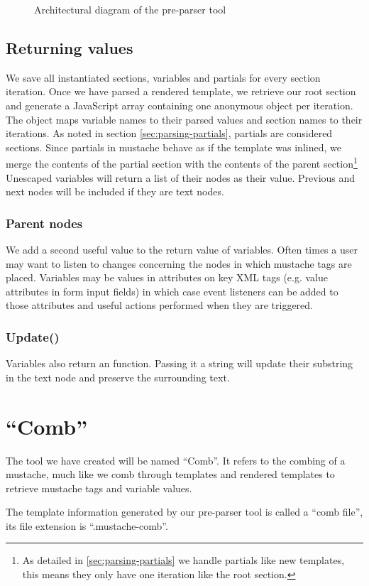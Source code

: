 \documentclass[thesis.tex]{subfiles}
\begin{document}
\begin{figure}
	\centering
	\resizebox{\linewidth}{!}{}
	\caption{Architectural diagram of the pre-parser tool}
	\label{fig:tool-arch}
\end{figure}

\subsection{Returning values}
We save all instantiated sections, variables and partials for every section
iteration. Once we have parsed a rendered template, we retrieve our root section
and generate a JavaScript array containing one anonymous object per iteration.
The object maps variable names to their parsed values and section names to their
iterations.
As noted in section \ref{sec:parsing-partials}, partials are considered
sections. Since partials in mustache behave as if the template was inlined,
we merge the contents of the partial section with the contents of the
parent section\footnote{
	As detailed in \ref{sec:parsing-partials} we handle partials like new
	templates, this means they only have one iteration like the root section.
}
Unescaped variables will return a list of their nodes as their value.
Previous and next nodes will be included if they are text nodes.

\subsubsection{Parent nodes}
\label{sec:parent-nodes}
We add a second useful value to the return value of variables. Often times a
user may want to listen to changes concerning the nodes in which mustache tags
are placed. Variables may be values in attributes on key XML tags
(e.g. value attributes in form input fields) in which case event listeners can
be added to those attributes and useful actions performed when they are
triggered.

\subsubsection{Update()}
\label{sec:update}
Variables also return an  function. Passing it a string
will update their substring in the text node and preserve the surrounding text.

\section{``Comb''}
The tool we have created will be named ``Comb''. It refers to the combing of
a mustache, much like we comb through templates and rendered templates to
retrieve mustache tags and variable values.

The template information generated by our pre-parser tool is called a
``comb file'', its file extension is ``.mustache-comb''.
\end{document}
